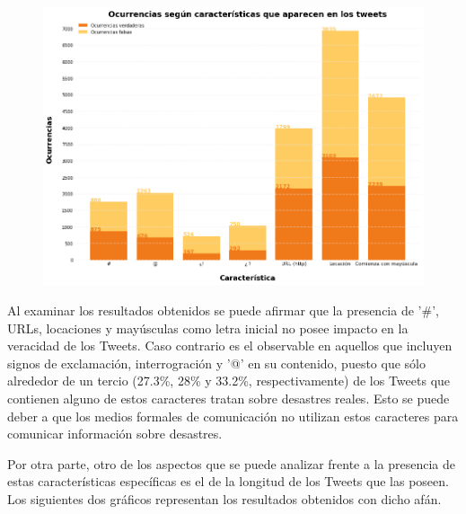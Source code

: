 \documentclass[titlepage,a4paper]{article}
\begin{document}
    \begin{figure}[H]
    \centering
    \includegraphics[width=1\textwidth]{graficos/Analisis Lexico Grafico/ocurrencias_segun_caracteristicas_que_aparecen_en_los_tweets.png}
    \caption{} 
    \end{figure}
    
    Al examinar los resultados obtenidos se puede afirmar que la presencia de '\#', URLs, locaciones y mayúsculas como letra inicial no posee impacto en la veracidad de los Tweets. Caso contrario es el observable en aquellos que incluyen signos de exclamación, interrogración y '@' en su contenido, puesto que sólo alrededor de un tercio (27.3\%, 28\% y 33.2\%, respectivamente) de los Tweets que contienen alguno de estos caracteres tratan sobre desastres reales. Esto se puede deber a que los medios formales de comunicación no utilizan estos caracteres para comunicar información sobre desastres.
    
    Por otra parte, otro de los aspectos que se puede analizar frente a la presencia de estas características específicas es el de la longitud de los Tweets que las poseen. Los siguientes dos gráficos representan los resultados obtenidos con dicho afán.
\end{document}
